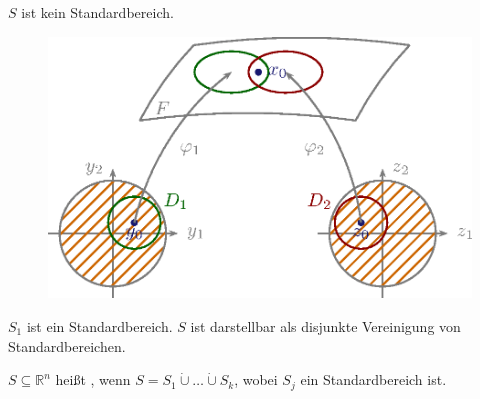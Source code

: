 \documentclass[a4paper,10pt]{scrbook}
\begin{document}

\begin{example}
  $S$ ist kein Standardbereich.
  \begin{figure}[H]
    \centering
    \includegraphics[scale=0.2]{images/ana3-tmp-68}
  \end{figure}
  $S_1$ ist ein Standardbereich. $S$ ist darstellbar als disjunkte Vereinigung von Standardbereichen.
\end{example}

\begin{theorem}[Definition]
  $S \subseteq \mathbb{R}^n$ heißt , wenn $S = S_1 \dot{\cup} \ldots \dot{\cup} S_k$, wobei $S_j$ ein Standardbereich ist.
\end{theorem}
\end{document}
